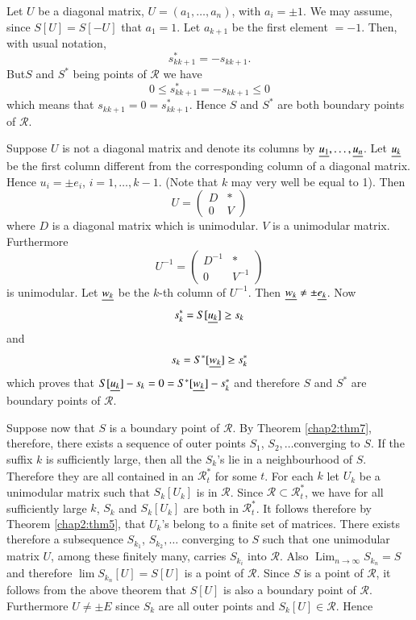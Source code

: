 Let $U$ be a diagonal matrix, $U=(a_{1},\ldots,a_{n})$, with
$a_{i}=\pm 1$. We may assume, since $S[U]=S[-U]$ that $a_{1}=1$. Let
$a_{k+1}$ be the first element $=-1$. Then, with usual notation,
$$
s^{\ast}_{kk+1}=-s_{kk+1}.
$$
But\pageoriginale $S$ and $S^{\ast}$ being points of $\mathscr{R}$ we
have
$$
0\leq s^{\ast}_{kk+1} = -s_{kk+1} \leq 0
$$
which means that $s_{kk+1}=0=s^{\ast}_{kk+1}$. Hence $S$ and
$S^{\ast}$ are both boundary points of $\mathscr{R}$.

Suppose $U$ is not a diagonal matrix and denote its columns by
$\ub{u_{1}},\break\ldots,\ub{u_{n}}$. Let $\underline{u_{k}}$ be the first column
different from the corresponding column of a diagonal matrix. Hence
$u_{i}=\pm e_{i}$, $i=1,\ldots,k-1$. (Note that $k$ may very well be
equal to 1). Then
$$
U=
\begin{pmatrix}
D & \ast\\
0 & V
\end{pmatrix}
$$
where $D$ is a diagonal matrix which is unimodular. $V$ is a
unimodular matrix. Furthermore
$$
U^{-1}=
\begin{pmatrix}
D^{-1} & \ast\\
0 & V^{-1}
\end{pmatrix}
$$
is unimodular. Let $\underline{w_{k}}$ be the $k$-th column of $U^{-1}$. Then
$\underline{w_{k}}\neq \pm \underline{e_{k}}$. Now
$$
s^{\ast}_{k}=S[\underline{u_{k}}]\geq s_{k}
$$
and 
$$
s_{k}=S^{\ast}[\underline{w_{k}}]\geq s^{\ast}_{k}
$$
which proves that
$S[\underline{u_{k}}]-s_{k}=0=S^{\ast}[\underline{w_{k}}]-s^{\ast}_{k}$ and
therefore $S$ and $S^{\ast}$ are boundary points of $\mathscr{R}$.

Suppose now that $S$ is a boundary point of $\mathscr{R}$. By Theorem
\ref{chap2:thm7}, therefore, there exists a sequence of outer points
$S_{1}$, $S_{2},\ldots$\pageoriginale converging to $S$. If the suffix
$k$ is sufficiently large, then all the $S_{k}$'s lie in a
neighbourhood of $S$. Therefore they are all contained in an
$\mathscr{R}^{\ast}_{t}$ for some $t$. For each $k$ let $U_{k}$ be a
unimodular matrix such that $S_{k}[U_{k}]$ is in $\mathscr{R}$. Since
$\mathscr{R}\subset \mathscr{R}^{\ast}_{t}$, we have for all
sufficiently large $k$, $S_{k}$ and $S_{k}[U_{k}]$ are both in
$\mathscr{R}^{\ast}_{t}$. It follows therefore by Theorem \ref{chap2:thm5},
that $U_{k}$'s belong to a finite set of matrices. There exists
therefore a subsequence $S_{k_{1}}$, $S_{k_{2}},\ldots$ converging to
$S$ such that one unimodular matrix $U$, among these finitely many,
carries $S_{k_{i}}$ into $\mathscr{R}$. Also
${\displaystyle{\mathop{\text{Lim}}_{n\to \infty}}}S_{k_{n}}=S$ and therefore
$\lim S_{k_{n}}[U]=S[U]$ is a point of $\mathscr{R}$. Since $S$ is a
point of $\mathscr{R}$, it follows from the above theorem that $S[U]$
is also a boundary point of $\mathscr{R}$. Furthermore $U\neq \pm E$
since $S_{k}$ are all outer points and $S_{k}[U]\in\mathscr{R}$. Hence

